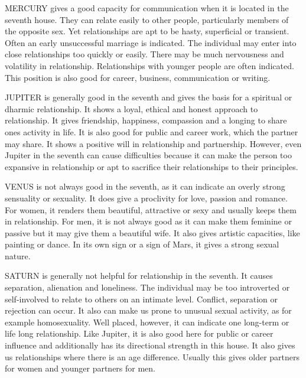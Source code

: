  

MERCURY gives a good capacity for communication when it is located in the seventh house. They can relate easily to other people, particularly members of the opposite sex. Yet relationships are apt to be hasty, superficial or transient. Often an early unsuccessful marriage is indicated. The individual may enter into close relationships too quickly or easily. There may be much nervousness and volatility in relationship. Relationships with younger people are often indicated. This position is also good for career, business, communication or writing.

 

JUPITER is generally good in the seventh and gives the basis for a spiritual or dharmic relationship. It shows a loyal, ethical and honest approach to relationship. It gives friendship, happiness, compassion and a longing to share ones activity in life. It is also good for public and career work, which the partner may share. It shows a positive will in relationship and partnership. However, even Jupiter in the seventh can cause difficulties because it can make the person too expansive in relationship or apt to sacrifice their relationships to their principles.

 

VENUS is not always good in the seventh, as it can indicate an overly strong sensuality or sexuality. It does give a proclivity for love, passion and romance. For women, it renders them beautiful, attractive or sexy and usually keeps them in relationship. For men, it is not always good as it can make them feminine or passive but it may give them a beautiful wife. It also gives artistic capacities, like painting or dance. In its own sign or a sign of Mars, it gives a strong sexual nature.

 

SATURN is generally not helpful for relationship in the seventh. It causes separation, alienation and loneliness. The individual may be too introverted or self-involved to relate to others on an intimate level. Conflict, separation or rejection can occur. It also can make us prone to unusual sexual activity, as for example homosexuality. Well placed, however, it can indicate one long-term or life long relationship. Like Jupiter, it is also good here for public or career influence and additionally has its directional strength in this house. It also gives us relationships where there is an age difference. Usually this gives older partners for women and younger partners for men.

